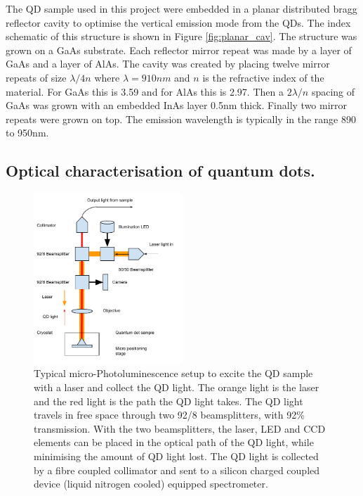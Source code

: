 The QD sample used in this project were embedded in a planar distributed bragg
reflector cavity to optimise the vertical emission mode from the
QDs\cite{bennett2005microcavity, 1367-2630-10-4-043035, Bennett_05}. The index
schematic of this structure is shown in Figure \ref{fig:planar_cav}. The
structure was grown on a GaAs substrate. Each reflector mirror repeat was made
by a layer of GaAs and a layer of AlAs. The cavity was created by placing twelve
mirror repeats of size $\lambda/4n$ where $\lambda = 910nm$ and $n$ is the
refractive index of the material. For GaAs this is 3.59 and for AlAs this is
2.97. Then a $2\lambda/n$ spacing of GaAs was grown with an embedded InAs layer
0.5nm thick. Finally two mirror repeats were grown on top. The emission
wavelength is typically in the range 890 to 950nm.

\subsection{Optical characterisation of quantum dots.}

\begin{figure}[h!] \begin{center}
\includegraphics[width=0.5\textwidth]{images/qd_char.pdf} \caption{
Typical micro-Photoluminescence setup to excite the QD sample with a laser and
collect the QD light. The orange light is the laser and the red light is the
path the QD light takes. The QD light travels in free space through two 92/8
beamsplitters, with 92\% transmission. With the two beamsplitters, the laser,
LED and CCD elements can be placed in the optical path of the QD light, while
minimising the amount of QD light lost. The QD light is collected by a  fibre
coupled collimator and sent to a silicon charged coupled device (liquid nitrogen
cooled) equipped spectrometer.
} \label{fig:qd_char} \end{center} \end{figure}

